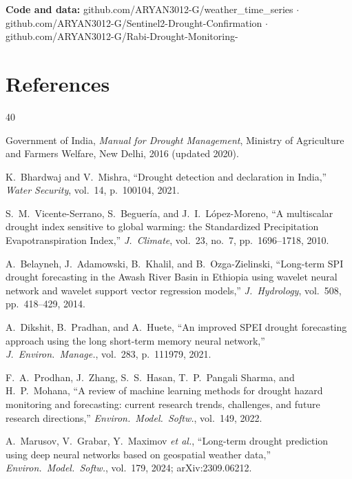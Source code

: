 \documentclass[11pt,a4paper,oneside]{article}
\begin{document}
\textbf{Code and data:} github.com/ARYAN3012-G/weather\_time\_series $\cdot$ github.com/ARYAN3012-G/Sentinel2-Drought-Confirmation $\cdot$ github.com/ARYAN3012-G/Rabi-Drought-Monitoring-

\section{References}
\begingroup
\small
\setlength{\parskip}{0pt}
\renewcommand{\section}[2]{}
\begin{thebibliography}{40}
\setlength{\itemsep}{0pt}
\setlength{\parsep}{0pt}

 Government of India, \textit{Manual for Drought Management}, Ministry of Agriculture and Farmers Welfare, New Delhi, 2016 (updated 2020).

 K.~Bhardwaj and V.~Mishra, ``Drought detection and declaration in India,'' \textit{Water Security}, vol.~14, p.~100104, 2021.

 S.~M.~Vicente-Serrano, S.~Beguer\'{i}a, and J.~I.~L\'{o}pez-Moreno, ``A multiscalar drought index sensitive to global warming: the Standardized Precipitation Evapotranspiration Index,'' \textit{J.\ Climate}, vol.~23, no.~7, pp.~1696--1718, 2010.

 A.~Belayneh, J.~Adamowski, B.~Khalil, and B.~Ozga-Zielinski, ``Long-term SPI drought forecasting in the Awash River Basin in Ethiopia using wavelet neural network and wavelet support vector regression models,'' \textit{J.\ Hydrology}, vol.~508, pp.~418--429, 2014.

 A.~Dikshit, B.~Pradhan, and A.~Huete, ``An improved SPEI drought forecasting approach using the long short-term memory neural network,'' \textit{J.\ Environ.\ Manage.}, vol.~283, p.~111979, 2021.

 F.~A.~Prodhan, J.~Zhang, S.~S.~Hasan, T.~P.~Pangali Sharma, and H.~P.~Mohana, ``A review of machine learning methods for drought hazard monitoring and forecasting: current research trends, challenges, and future research directions,'' \textit{Environ.\ Model.\ Softw.}, vol.~149, 2022.

 A.~Marusov, V.~Grabar, Y.~Maximov \textit{et al.}, ``Long-term drought prediction using deep neural networks based on geospatial weather data,'' \textit{Environ.\ Model.\ Softw.}, vol.~179, 2024; arXiv:2309.06212.


\end{thebibliography}
\end{document}
